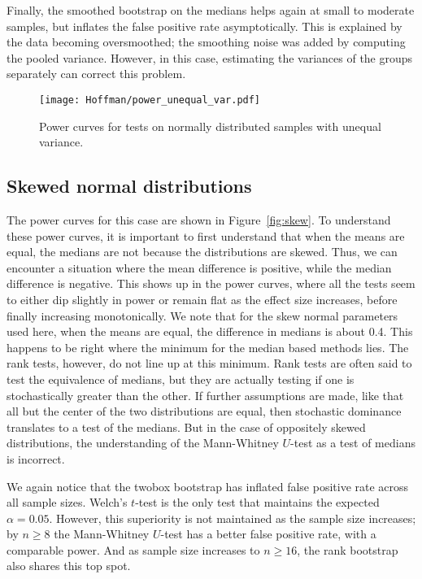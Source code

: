\documentclass[10pt]{article} %
\begin{document}
Finally, the smoothed bootstrap on the medians helps again at small to moderate samples, but inflates the false positive rate asymptotically. This is explained by the data becoming oversmoothed; the smoothing noise was added by computing the pooled variance. However, in this case, estimating the variances of the groups separately can correct this problem.


\begin{figure}
  \texttt{[image: Hoffman/power\_unequal\_var.pdf]}
  \caption{Power curves for tests on normally distributed samples with unequal variance.}
  \label{fig:unequalvar}
\end{figure}





\subsection{Skewed normal distributions}
The power curves for this case are shown in Figure~\ref{fig:skew}. To understand these power curves, it is important to first understand that when the means are equal, the medians are not because the distributions are skewed. Thus, we can encounter a situation where the mean difference is positive, while the median difference is negative. This shows up in the power curves, where all the tests seem to either dip slightly in power or remain flat as the effect size increases, before finally increasing monotonically. We note that for the skew normal parameters used here, when the means are equal, the difference in medians is about 0.4. This happens to be right where the minimum for the median based methods lies. The rank tests, however, do not line up at this minimum. Rank tests are often said to test the equivalence of medians, but they are actually testing if one is stochastically greater than the other. If further assumptions are made, like that all but the center of the two distributions are equal, then stochastic dominance translates to a test of the medians. But in the case of oppositely skewed distributions, the understanding of the Mann-Whitney $U$-test as a test of medians is incorrect.

We again notice that the twobox bootstrap has inflated false positive rate across all sample sizes. Welch's $t$-test is the only test that maintains the expected $\alpha=0.05$. However, this superiority is not maintained as the sample size increases; by $n\geq8$ the Mann-Whitney $U$-test has a better false positive rate, with a comparable power. And as sample size increases to $n\geq16$, the rank bootstrap also shares this top spot.
\end{document}
